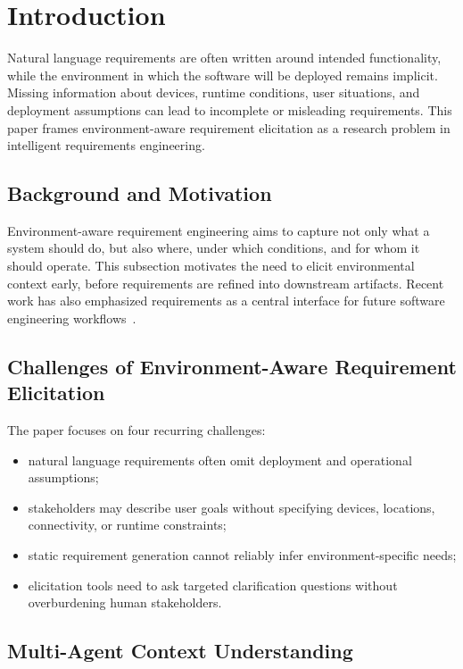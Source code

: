 \section{Introduction}
\label{introduction}

Natural language requirements are often written around intended functionality, while the environment in which the software will be deployed remains implicit.
Missing information about devices, runtime conditions, user situations, and deployment assumptions can lead to incomplete or misleading requirements.
This paper frames environment-aware requirement elicitation as a research problem in intelligent requirements engineering.

\subsection{Background and Motivation}
\label{intro:background}

Environment-aware requirement engineering aims to capture not only what a system should do, but also where, under which conditions, and for whom it should operate.
This subsection motivates the need to elicit environmental context early, before requirements are refined into downstream artifacts.
Recent work has also emphasized requirements as a central interface for future software engineering workflows~\cite{robinsonRequirementsAreAll2025}.

\subsection{Challenges of Environment-Aware Requirement Elicitation}
\label{intro:challenges}

The paper focuses on four recurring challenges:
\begin{itemize}[leftmargin=*]
  \item natural language requirements often omit deployment and operational assumptions;
  \item stakeholders may describe user goals without specifying devices, locations, connectivity, or runtime constraints;
  \item static requirement generation cannot reliably infer environment-specific needs;
  \item elicitation tools need to ask targeted clarification questions without overburdening human stakeholders.
\end{itemize}

\subsection{Multi-Agent Context Understanding}
\label{intro:multi_agent_context}

